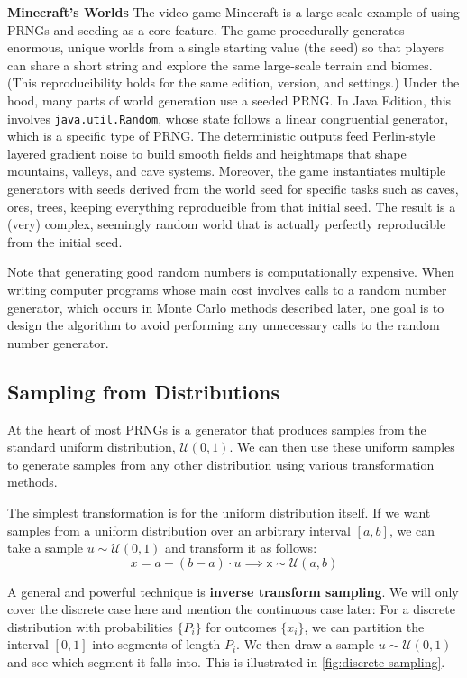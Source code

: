 \begin{exampleBox}
    \textbf{Minecraft's Worlds}
    The video game Minecraft is a large-scale example of using PRNGs and seeding as a core feature. The game procedurally generates enormous, unique worlds from a single starting value (the seed) so that players can share a short string and explore the same large-scale terrain and biomes. (This reproducibility holds for the same edition, version, and settings.) Under the hood, many parts of world generation use a seeded PRNG. In Java Edition, this involves \texttt{java.util.Random}, whose state follows a linear congruential generator, which is a specific type of PRNG. The deterministic outputs feed Perlin-style layered gradient noise to build smooth fields and heightmaps that shape mountains, valleys, and cave systems. Moreover, the game instantiates multiple generators with seeds derived from the world seed for specific tasks such as caves, ores, trees, keeping everything reproducible from that initial seed. The result is a (very) complex, seemingly random world that is actually perfectly reproducible from the initial seed.
\end{exampleBox}

Note that generating good random numbers is computationally expensive. When writing computer programs
whose main cost involves calls to a random number generator, which occurs in Monte Carlo methods
described later, one goal is to design the algorithm to avoid performing any unnecessary
calls to the random number generator.

\subsection{Sampling from Distributions}
At the heart of most PRNGs is a generator that produces samples from the standard uniform distribution, $\mathcal{U}(0, 1)$. We can then use these uniform samples to generate samples from any other distribution using various transformation methods.

The simplest transformation is for the uniform distribution itself. If we want samples from a uniform distribution over an arbitrary interval $[a, b]$, we can take a sample $u \sim \mathcal{U}(0, 1)$ and transform it as follows:
\begin{equation}
    x = a + (b - a) \cdot u \implies \mathsf{x} \sim \mathcal{U}(a, b)
\end{equation}

A general and powerful technique is \textbf{inverse transform sampling}. We will only cover the discrete case here and mention the continuous case later: For a discrete distribution with probabilities $\{P_i\}$ for outcomes $\{x_i\}$, we can partition the interval $[0, 1]$ into segments of length $P_i$. We then draw a sample $u \sim \mathcal{U}(0, 1)$ and see which segment it falls into. This is illustrated in \autoref{fig:discrete-sampling}. 

